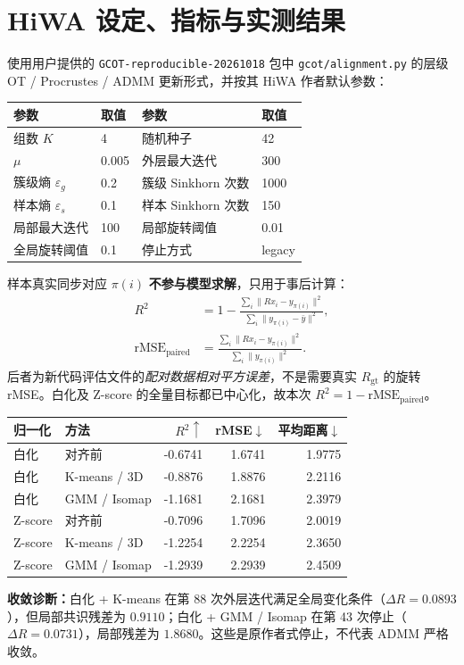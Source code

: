 \documentclass[UTF8,fontset=none,11pt,a4paper]{ctexart}
\begin{document}
\clearpage
\section{HiWA 设定、指标与实测结果}
使用用户提供的 \texttt{GCOT-reproducible-20261018} 包中 \texttt{gcot/alignment.py} 的层级 OT / Procrustes / ADMM 更新形式，并按其 HiWA 作者默认参数：
\begin{center}
\begin{tabular}{ll@{\qquad}ll}
\toprule
参数 & 取值 & 参数 & 取值\\
\midrule
组数 $K$ & 4 & 随机种子 & 42\\
$\mu$ & 0.005 & 外层最大迭代 & 300\\
簇级熵 $\varepsilon_g$ & 0.2 & 簇级 Sinkhorn 次数 & 1000\\
样本熵 $\varepsilon_s$ & 0.1 & 样本 Sinkhorn 次数 & 150\\
局部最大迭代 & 100 & 局部旋转阈值 & 0.01\\
全局旋转阈值 & 0.1 & 停止方式 & legacy\\
\bottomrule
\end{tabular}
\end{center}
样本真实同步对应 $\pi(i)$ \textbf{不参与模型求解}，只用于事后计算：
\begin{align}
R^2 &=1-\frac{\sum_i\|R x_i-y_{\pi(i)}\|^2}{\sum_i\|y_{\pi(i)}-\bar y\|^2},\\
\mathrm{rMSE}_{\mathrm{paired}}&=
\frac{\sum_i\|R x_i-y_{\pi(i)}\|^2}{\sum_i\|y_{\pi(i)}\|^2}.
\end{align}
后者为新代码评估文件的\emph{配对数据相对平方误差}，不是需要真实 $R_{\mathrm{gt}}$ 的旋转 rMSE。白化及 Z-score 的全量目标都已中心化，故本次 $R^2=1-\mathrm{rMSE}_{\mathrm{paired}}$。

\begin{center}\small
{}
\begin{tabular}{llrrr}
\toprule
归一化 & 方法 & $R^2\uparrow$ & rMSE$\downarrow$ & 平均距离$\downarrow$\\
\midrule
白化 & 对齐前 & -0.6741 & 1.6741 & 1.9775\\
白化 & K-means / 3D & -0.8876 & 1.8876 & 2.2116\\
白化 & GMM / Isomap & -1.1681 & 2.1681 & 2.3979\\
Z-score & 对齐前 & -0.7096 & 1.7096 & 2.0019\\
Z-score & K-means / 3D & -1.2254 & 2.2254 & 2.3650\\
Z-score & GMM / Isomap & -1.2939 & 2.2939 & 2.4509\\
\bottomrule
\end{tabular}
\end{center}
\noindent\textbf{收敛诊断：}白化 + K-means 在第 88 次外层迭代满足全局变化条件（$\Delta R=0.0893$），但局部共识残差为 $0.9110$；白化 + GMM / Isomap 在第 43 次停止（$\Delta R=0.0731$），局部残差为 $1.8680$。这些是原作者式停止，不代表 ADMM 严格收敛。
\end{document}
